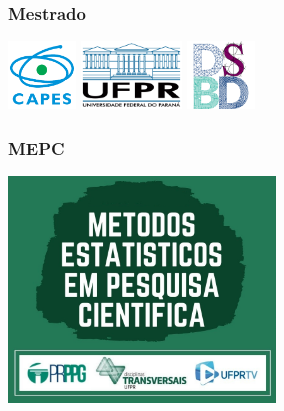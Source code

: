 \documentclass[10pt,
  aspectratio=169,
  serif,
  mathserif,
  professionalfont,
  compress,
  handout,
  ]{beamer}\usepackage[]{graphicx}\usepackage[]{color}
\begin{document}
\begin{frame}

\frametitle{Mestrado}

\begin{center}
  \includegraphics[height=1.8cm]{img/capes_tp2.png}\hspace{2em}
  \includegraphics[height=1.8cm]{img/ufpr-transparent.png}\hspace{2em}
  \includegraphics[height=1.8cm]{img/dsbd-2x2-trans.png}
\end{center}

\end{frame}



\begin{frame}

\frametitle{MEPC}

\begin{center}
  \includegraphics[height=6cm]{img/mepc.jpg}
\end{center}

\end{frame}

\end{document}
